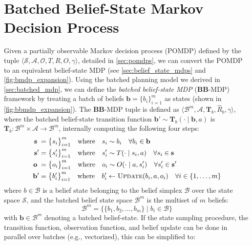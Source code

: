 \section{Batched Belief-State Markov Decision Process}
Given a partially observable Markov decision process (POMDP) defined by the tuple $\langle \mathcal{S}, \mathcal{A}, \mathcal{O}, T, R, O, \gamma \rangle$, detailed in \cref{sec:pomdps}, we can convert the POMDP to an equivalent belief-state MDP (see \cref{sec:belief_state_mdps} and \cref{fig:bmdp_expansion}).
Using the batched planning model we derived in \cref{sec:batched_mdp}, we can define the \textit{batched belief-state MDP} (\textbf{BB}-MDP) framework by treating a batch of beliefs $\mathbf{b} = \{b_i\}_{i=1}^m$ as states (shown in \cref{fig:bbmdp_expansion}).
The \textbf{BB}-MDP tuple is defined as $\langle \mathcal{B}^m, \mathcal{A}, \mathbf{T}_b, \widehat{R}_b, \gamma \rangle$, where the batched belief-state transition function $\mathbf{b}' \sim \mathbf{T}_b(\cdot \mid \mathbf{b}, a)$ is $\mathbf{T}_b: \mathcal{B}^m \times \mathcal{A} \to \mathcal{B}^m$, internally computing the following four steps:
\begin{align}
    \mathbf{s}\phantom{'} &= \big\{s_i \big\}_{i=1}^m \quad \text{where} \quad s_i \sim b_i \quad \forall b_i \in \mathbf{b} \label{eq:tbb1} \\ 
    \mathbf{s}' &= \big\{s_i'\big\}_{i=1}^m \quad \text{where} \quad s'_i \sim T(\cdot \mid s_i, a) \quad \forall s_i \in \mathbf{s} \label{eq:tbb2} \\
    \mathbf{o}\phantom{'} &= \big\{o_i\big\}_{i=1}^m \quad \text{where} \quad o_i \sim O(\cdot \mid a, s_i') \quad \forall s_i' \in \mathbf{s}' \label{eq:tbb3} \\
    \mathbf{b}' &= \big\{b'_i\big\}_{i=1}^m \quad \text{where} \quad b_i' \leftarrow \textsc{Update}(b_i, a, o_i) \quad \forall i \in \{1,\ldots,m\} \label{eq:tbb4}
\end{align}
where $b \in \mathcal{B}$ is a belief state belonging to the belief simplex $\mathcal{B}$ over the state space $\mathcal{S}$, and the batched belief state space $\mathcal{B}^m$ is the multiset of $m$ beliefs:
\begin{equation}
    \mathcal{B}^m = \big\{ \{b_1,b_2,\ldots,b_m\} \mid b_i \in \mathcal{B} \big\}
\end{equation}
with $\mathbf{b} \in \mathcal{B}^m$ denoting a batched belief-state.
If the state sampling procedure, the transition function, observation function, and belief update can be done in parallel over batches (e.g., vectorized), this can be simplified to:
